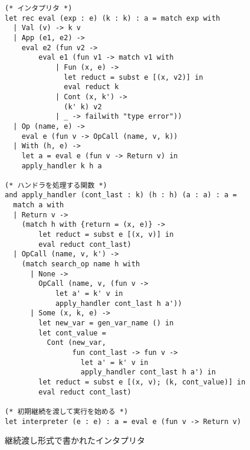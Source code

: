 \begin{figure}
\begin{verbatim}
(* インタプリタ *)
let rec eval (exp : e) (k : k) : a = match exp with
  | Val (v) -> k v
  | App (e1, e2) ->
    eval e2 (fun v2 ->
        eval e1 (fun v1 -> match v1 with
            | Fun (x, e) ->
              let reduct = subst e [(x, v2)] in
              eval reduct k
            | Cont (x, k') ->
              (k' k) v2
            | _ -> failwith "type error"))
  | Op (name, e) ->
    eval e (fun v -> OpCall (name, v, k))
  | With (h, e) ->
    let a = eval e (fun v -> Return v) in
    apply_handler k h a

(* ハンドラを処理する関数 *)
and apply_handler (cont_last : k) (h : h) (a : a) : a =
  match a with
  | Return v ->
    (match h with {return = (x, e)} ->
        let reduct = subst e [(x, v)] in
        eval reduct cont_last)
  | OpCall (name, v, k') ->
    (match search_op name h with
      | None ->
        OpCall (name, v, (fun v ->
            let a' = k' v in
            apply_handler cont_last h a'))
      | Some (x, k, e) ->
        let new_var = gen_var_name () in
        let cont_value =
          Cont (new_var,
                fun cont_last -> fun v ->
                  let a' = k' v in
                  apply_handler cont_last h a') in
        let reduct = subst e [(x, v); (k, cont_value)] in
        eval reduct cont_last)

(* 初期継続を渡して実行を始める *)
let interpreter (e : e) : a = eval e (fun v -> Return v)
\end{verbatim}
\caption{継続渡し形式で書かれたインタプリタ}
\label{figure:1cps}
\end{figure}
